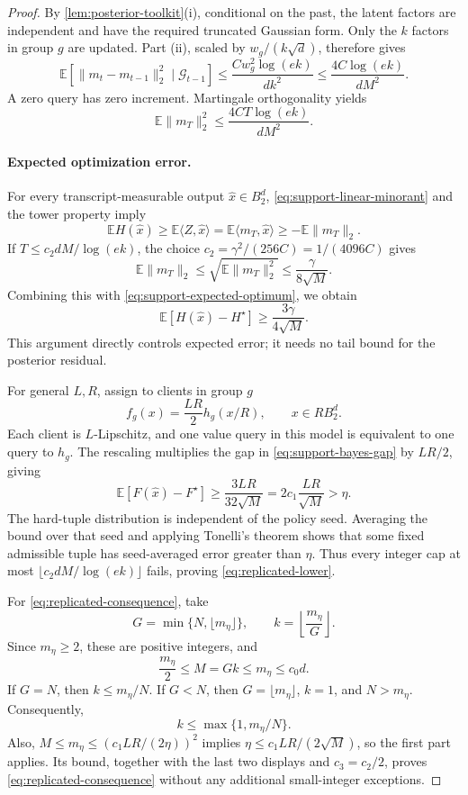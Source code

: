 \documentclass[11pt]{article}
\numberwithin{equation}{section}
\theoremstyle{remark}
\theoremstyle{definition}
\newcommand{\E}{\mathbb{E}}
\newcommand{\cG}{\mathcal{G}}
\newcommand{\Ball}{B_2}
\newcommand{\ip}[2]{\langle #1,#2\rangle}
\newcommand{\norm}[1]{\lVert #1\rVert_2}
\begin{document}
\begin{proof}
By \cref{lem:posterior-toolkit}(i), conditional on the past, the latent
factors are independent and have the required truncated Gaussian
form. Only the $k$ factors in group $g$ are updated. Part (ii), scaled
by $w_g/(k\sqrt d)$, therefore gives
\[
 \E[\norm{m_t-m_{t-1}}^2\mid\cG_{t-1}]
 \le\frac{Cw_g^2\log(ek)}{dk^2}
 \le\frac{4C\log(ek)}{dM^2}.
\]
A zero query has zero increment. Martingale orthogonality yields
\begin{equation}
 \E\norm{m_T}^2\le\frac{4CT\log(ek)}{dM^2}.
 \label{eq:support-martingale-energy}
\end{equation}

\paragraph{Expected optimization error.}
For every transcript-measurable output $\widehat x\in\Ball^d$,
\eqref{eq:support-linear-minorant} and the tower property imply
\[
 \E H(\widehat x)
 \ge\E\ip Z{\widehat x}
 =\E\ip{m_T}{\widehat x}
 \ge-\E\norm{m_T}.
\]
If $T\le c_2dM/\log(ek)$, the choice
$c_2=\gamma^2/(256C)=1/(4096C)$ gives
\[
 \E\norm{m_T}\le\sqrt{\E\norm{m_T}^2}
 \le\frac\gamma{8\sqrt M}.
\]
Combining this with \eqref{eq:support-expected-optimum}, we obtain
\begin{equation}
 \E[H(\widehat x)-H^\star]
 \ge\frac{3\gamma}{4\sqrt M}.
 \label{eq:support-bayes-gap}
\end{equation}
This argument directly controls expected error; it needs no tail bound
for the posterior residual.

For general $L,R$, assign to clients in group $g$
\[
 f_g(x)=\frac{LR}{2}h_g(x/R),\qquad x\in R\Ball^d.
\]
Each client is $L$-Lipschitz, and one value query in this model is
equivalent to one query to $h_g$. The rescaling multiplies the gap
in \eqref{eq:support-bayes-gap} by $LR/2$, giving
\[
 \E[F(\widehat x)-F^\star]
 \ge\frac{3LR}{32\sqrt M}
 =2c_1\frac{LR}{\sqrt M}>\eta.
\]
The hard-tuple distribution is independent of the policy seed.
Averaging the bound over that seed and applying Tonelli's theorem
shows that some fixed admissible tuple has seed-averaged error greater
than $\eta$. Thus every integer cap at most
$\lfloor c_2dM/\log(ek)\rfloor$ fails, proving
\eqref{eq:replicated-lower}.

For \eqref{eq:replicated-consequence}, take
\[
 G=\min\{N,\lfloor m_\eta\rfloor\},\qquad
 k=\left\lfloor\frac{m_\eta}{G}\right\rfloor.
\]
Since $m_\eta\ge2$, these are positive integers, and
\[
 \frac{m_\eta}{2}\le M=Gk\le m_\eta\le c_0d.
\]
If $G=N$, then $k\le m_\eta/N$. If $G<N$, then
$G=\lfloor m_\eta\rfloor$, $k=1$, and $N>m_\eta$.
Consequently,
\[
 k\le\max\{1,m_\eta/N\}.
\]
Also, $M\le m_\eta\le(c_1LR/(2\eta))^2$ implies
$\eta\le c_1LR/(2\sqrt M)$, so the first part applies.
Its bound, together with the last two displays and $c_3=c_2/2$,
proves \eqref{eq:replicated-consequence} without any additional
small-integer exceptions.
\end{proof}
\end{document}
